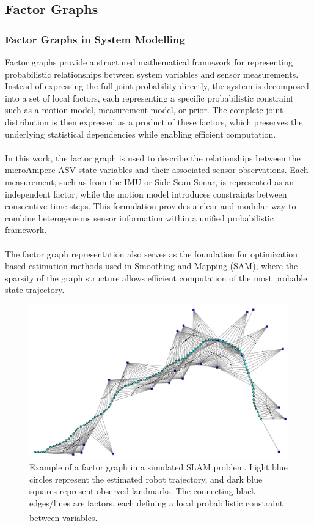 \subsection{Factor Graphs}
\subsubsection{Factor Graphs in System Modelling}
Factor graphs provide a structured mathematical framework for representing probabilistic relationships between system variables and sensor measurements. Instead of expressing the full joint probability directly, the system is decomposed into a set of local factors, each representing a specific probabilistic constraint such as a motion model, measurement model, or prior. The complete joint distribution is then expressed as a product of these factors, which preserves the underlying statistical dependencies while enabling efficient computation.  
\\ \\
In this work, the factor graph is used to describe the relationships between the microAmpere ASV state variables and their associated sensor observations. Each measurement, such as from the IMU or Side Scan Sonar, is represented as an independent factor, while the motion model introduces constraints between consecutive time steps. 
This formulation provides a clear and modular way to combine heterogeneous sensor information within a unified probabilistic framework.  
\\ \\
The factor graph representation also serves as the foundation for optimization based estimation methods used in Smoothing and Mapping (SAM), where the sparsity of the graph structure allows efficient computation of the most probable state trajectory.

\begin{figure}[H]
    \centering
    \includegraphics[width=0.9\linewidth]{Pictures/System_Modeling/Factor_Graphs/Example.png}
    \caption{Example of a factor graph in a simulated SLAM problem. Light blue circles represent the estimated robot trajectory, and dark blue squares represent observed landmarks. The connecting black edges/lines are factors, each defining a local probabilistic constraint between variables.\textsuperscript{\cite{factor_graphs}}}
    \label{fig:system-modeling-factor-graph-example}
\end{figure}

